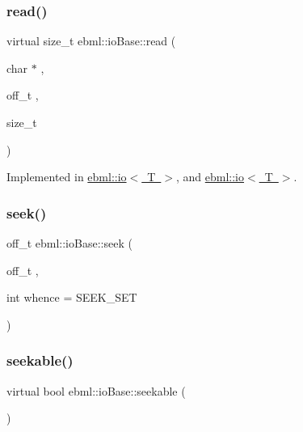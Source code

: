 \mbox{\label{classebml_1_1ioBase_aba93b64f19016207b3d6c43183a2be07}} 
\subsubsection{\texorpdfstring{read()}{read()}\hspace{0.1cm}{\footnotesize\ttfamily [2/2]}}
{\footnotesize\ttfamily virtual size\+\_\+t ebml\+::io\+Base\+::read (\begin{DoxyParamCaption}\item[{char $\ast$}]{,  }\item[{off\+\_\+t}]{,  }\item[{size\+\_\+t}]{ }\end{DoxyParamCaption})\hspace{0.3cm}{\ttfamily [pure virtual]}}



Implemented in \mbox{\hyperlink{classebml_1_1io_ad745dc2c29544750dcd38a21cba0a16c}{ebml\+::io$<$ T $>$}}, and \mbox{\hyperlink{classebml_1_1io_a3b291aa8fb7bbeeb3f9d2ef152c37115}{ebml\+::io$<$ T $>$}}.

\mbox{\label{classebml_1_1ioBase_ac4a5db64f2c7c8e791039f1b269d8f1a}} 
\subsubsection{\texorpdfstring{seek()}{seek()}}
{\footnotesize\ttfamily off\+\_\+t ebml\+::io\+Base\+::seek (\begin{DoxyParamCaption}\item[{off\+\_\+t}]{,  }\item[{int}]{whence = {\ttfamily SEEK\+\_\+SET} }\end{DoxyParamCaption})}

\mbox{\label{classebml_1_1ioBase_a413541f633f97d68021cbf58837e1970}} 
\subsubsection{\texorpdfstring{seekable()}{seekable()}}
{\footnotesize\ttfamily virtual bool ebml\+::io\+Base\+::seekable (\begin{DoxyParamCaption}{ }\end{DoxyParamCaption})\hspace{0.3cm}{\ttfamily [pure virtual]}}



